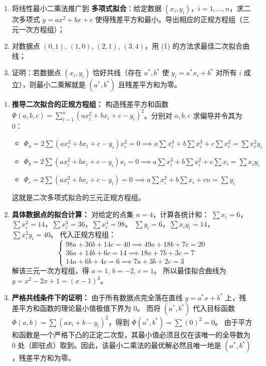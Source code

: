 \documentclass[lang=cn,11pt]{elegantbook}
\begin{document}
\begin{exercise}[提高：最小二乘法的推广]
\begin{enumerate}
  \item[(1)] 将线性最小二乘法推广到 \textbf{多项式拟合}：给定数据 $(x_i,y_i)$，$i=1,\dots,n$，求二次多项式 $y=ax^2+bx+c$ 使得残差平方和最小。导出相应的正规方程组（三元一次方程组）；
  \item[(2)] 对数据点 $(0,1)$, $(1,0)$, $(2,1)$, $(3,4)$，用 (1) 的方法求最佳二次拟合曲线；
  \item[(3)] 证明：若数据点 $(x_i,y_i)$ 恰好共线（存在 $a^*,b^*$ 使 $y_i=a^*x_i+b^*$ 对所有 $i$ 成立），则最小二乘解就是 $(a^*,b^*)$ 且残差平方和为零。
\end{enumerate}
\end{exercise}

\begin{solution}
\begin{enumerate}
  \item[(1)] \textbf{推导二次拟合的正规方程组：}
  构造残差平方和函数 $\Phi(a,b,c) = \sum_{i=1}^n (ax_i^2+bx_i+c-y_i)^2$。分别对 $a, b, c$ 求偏导并令其为 0：
  \begin{itemize}
    \item $\Phi_a = 2 \sum (ax_i^2+bx_i+c-y_i)x_i^2 = 0 \implies a\sum x_i^4 + b\sum x_i^3 + c\sum x_i^2 = \sum x_i^2 y_i$
    \item $\Phi_b = 2 \sum (ax_i^2+bx_i+c-y_i)x_i = 0 \implies a\sum x_i^3 + b\sum x_i^2 + c\sum x_i = \sum x_i y_i$
    \item $\Phi_c = 2 \sum (ax_i^2+bx_i+c-y_i) = 0 \implies a\sum x_i^2 + b\sum x_i + cn = \sum y_i$
  \end{itemize}
  这就是二次多项式拟合的三元正规方程组。

  \item[(2)] \textbf{具体数据点的拟合计算：}
  对给定的点集 $n=4$，计算各统计和：
  $\sum x_i = 6$，$\sum x_i^2 = 14$，$\sum x_i^3 = 36$，$\sum x_i^4 = 98$。
  $\sum y_i = 6$，$\sum x_iy_i = 14$，$\sum x_i^2y_i = 40$。
  代入正规方程组：
  \[
  \begin{cases}
  98a + 36b + 14c = 40 \implies 49a + 18b + 7c = 20 \\
  36a + 14b + 6c = 14 \implies 18a + 7b + 3c = 7 \\
  14a + 6b + 4c = 6 \implies 7a + 3b + 2c = 3
  \end{cases}
  \]
  解该三元一次方程组，得 $a=1$, $b=-2$, $c=1$。
  所以最佳拟合曲线为 $\boxed{y = x^2-2x+1 = (x-1)^2}$。
    \item[(3)] \textbf{严格共线条件下的证明：}
  由于所有数据点完全落在直线 $y=a^*x+b^*$ 上，残差平方和函数的理论最小值极值下界为 $0$。
  而将 $(a^*, b^*)$ 代入目标函数 $\Phi(a,b) = \sum(ax_i+b-y_i)^2$，得到 $\Phi(a^*,b^*) = \sum(0)^2 = 0$。
  由于平方和函数是一个严格下凸的正定二次型，其最小值必须且仅在该唯一的全导数为 0 处（即驻点）取到。因此，该最小二乘法的最优解必然且唯一地是 $(a^*, b^*)$，残差平方和为零。
\end{enumerate}
\end{solution}
\end{document}
